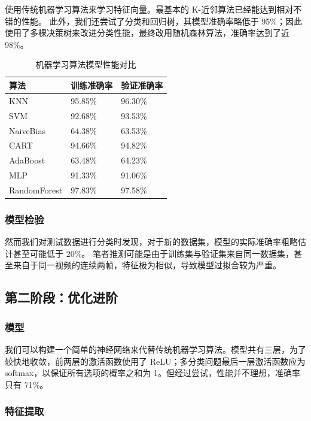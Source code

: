 \documentclass[12pt,titlepage]{article}
\begin{document}
使用传统机器学习算法来学习特征向量。最基本的 K-近邻算法已经能达到相对不错的性能。
此外，我们还尝试了分类和回归树，其模型准确率略低于 95\%；因此使用了多棵决策树来改进分类性能，最终改用随机森林算法，准确率达到了近 98\%。

\begin{table}[h!]
  \centering
  \begin{tabular}{|l|l|l|}
    \hline
    算法           & 训练准确率   & 验证准确率   \\
    \hline
    KNN          & 95.85\% & 96.30\% \\
    SVM          & 92.68\% & 93.53\% \\
    NaiveBias    & 64.38\% & 63.53\% \\
    CART         & 94.66\% & 94.82\% \\
    AdaBoost     & 63.48\% & 64.23\% \\
    MLP          & 91.33\% & 91.06\% \\
    RandomForest & 97.83\% & 97.58\% \\
    \hline
  \end{tabular}
  \caption{机器学习算法模型性能对比}
  \label{tab:ml-acc}
\end{table}

\subsubsection{模型检验}

然而我们对测试数据进行分类时发现，对于新的数据集，模型的实际准确率粗略估计甚至可能低于 20\%。
笔者推测可能是由于训练集与验证集来自同一数据集，甚至来自于同一视频的连续两帧，特征极为相似，导致模型过拟合较为严重。

\subsection{第二阶段：优化进阶}

\subsubsection{模型}

我们可以构建一个简单的神经网络来代替传统机器学习算法。模型共有三层，为了较快地收敛，前两层的激活函数使用了 ReLU；多分类问题最后一层激活函数应为 softmax，以保证所有选项的概率之和为 1。但经过尝试，性能并不理想，准确率只有 71\%。

\subsubsection{特征提取}
\end{document}
